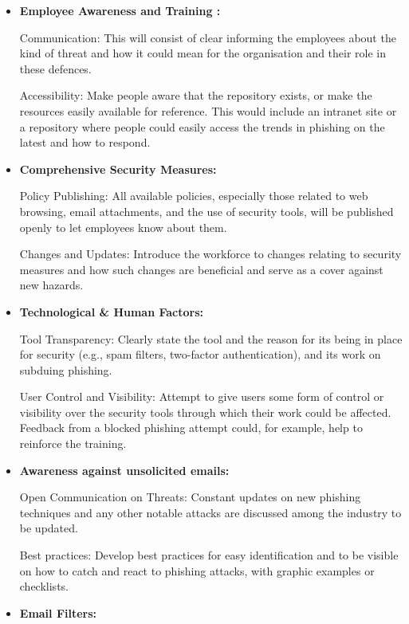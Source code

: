 \begin{itemize}
    \item \textbf{Employee Awareness and Training :} 
    
    Communication: This will consist of clear informing the employees about the kind of threat and how it could mean for the organisation and their role in these defences.
    
    Accessibility: Make people aware that the repository exists, or make the resources easily available for reference. This would include an intranet site or a repository where people could easily access the trends in phishing on the latest and how to respond.


     \item \textbf{Comprehensive Security Measures: }
     
     Policy Publishing: All available policies, especially those related to web browsing, email attachments, and the use of security tools, will be published openly to let employees know about them.
     

    Changes and Updates: Introduce the workforce to changes relating to security measures and how such changes are beneficial and serve as a cover against new hazards.

     \item \textbf{Technological \& Human Factors: } 
     
     Tool Transparency: Clearly state the tool and the reason for its being in place for security (e.g., spam filters, two-factor authentication), and its work on subduing phishing. 
     
    User Control and Visibility: Attempt to give users some form of control or visibility over the security tools through which their work could be affected. Feedback from a blocked phishing attempt could, for example, help to reinforce the training.

     \item \textbf{Awareness against unsolicited emails:  } 
     
     Open Communication on Threats: Constant updates on new phishing techniques and any other notable attacks are discussed among the industry to be updated.
     
    Best practices: Develop best practices for easy identification and to be visible on how to catch and react to phishing attacks, with graphic examples or checklists.

    \item \textbf{Email Filters:} 


\end{itemize}
